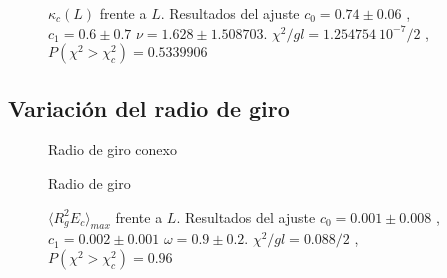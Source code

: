 \begin{figure}[h]
  \centering
  
  \caption{$\kappa_c(L)$ frente a $L$. Resultados del ajuste $c_0=0.74\pm
    0.06$ ,$c_1=0.6\pm 0.7 $ $\nu=1.628 \pm 1.508703$. $\chi^2/gl=1.254754 \
    10^{-7}/2$ , $P(\chi^2>\chi_c^2)=0.5339906$ }







\end{figure}
\clearpage

\subsection{Variación del radio de giro}

\begin{figure}[h]
  \centering
  
  \caption{Radio de giro conexo}
\end{figure}

\begin{figure}[h]
  \centering
  
  \caption{Radio de giro}
\end{figure}

\begin{figure}[h]
  \centering
  
  \caption{$\langle R_g^2 E_c\rangle_{max}$ frente a $L$. Resultados del
    ajuste $c_0=0.001\pm 0.008$ ,$c_1=0.002\pm 0.001 $ $\omega=0.9 \pm
    0.2$. $\chi^2/gl=0.088/2$ , $P(\chi^2>\chi_c^2)=0.96$ }






\end{figure}

